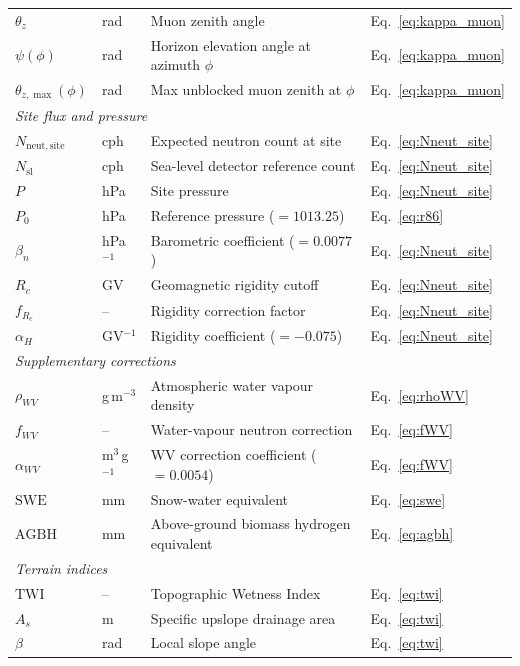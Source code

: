 \begin{table}[H]
\begin{tabularx}{\linewidth}{llXl}
$\theta_z$ & rad & Muon zenith angle & Eq.~\eqref{eq:kappa_muon} \\
$\psi(\phi)$ & rad & Horizon elevation angle at azimuth $\phi$ & Eq.~\eqref{eq:kappa_muon} \\
$\theta_{z,\max}(\phi)$ & rad & Max unblocked muon zenith at $\phi$ & Eq.~\eqref{eq:kappa_muon} \\
\midrule
\multicolumn{4}{l}{\textit{Site flux and pressure}} \\
$N_\mathrm{neut,site}$ & cph & Expected neutron count at site & Eq.~\eqref{eq:Nneut_site} \\
$N_\mathrm{sl}$ & cph & Sea-level detector reference count & Eq.~\eqref{eq:Nneut_site} \\
$P$        & hPa & Site pressure & Eq.~\eqref{eq:Nneut_site} \\
$P_0$      & hPa & Reference pressure ($= 1013.25$) & Eq.~\eqref{eq:r86} \\
$\beta_n$  & hPa$^{-1}$ & Barometric coefficient ($= 0.0077$) & Eq.~\eqref{eq:Nneut_site} \\
$R_c$      & GV & Geomagnetic rigidity cutoff & Eq.~\eqref{eq:Nneut_site} \\
$f_{R_c}$  & -- & Rigidity correction factor & Eq.~\eqref{eq:Nneut_site} \\
$\alpha_H$ & GV$^{-1}$ & Rigidity coefficient ($= -0.075$) & Eq.~\eqref{eq:Nneut_site} \\
\midrule
\multicolumn{4}{l}{\textit{Supplementary corrections}} \\
$\rho_{WV}$ & g\,m$^{-3}$ & Atmospheric water vapour density & Eq.~\eqref{eq:rhoWV} \\
$f_{WV}$   & -- & Water-vapour neutron correction & Eq.~\eqref{eq:fWV} \\
$\alpha_{WV}$ & m$^3$\,g$^{-1}$ & WV correction coefficient ($= 0.0054$) & Eq.~\eqref{eq:fWV} \\
$\mathrm{SWE}$ & mm & Snow-water equivalent & Eq.~\eqref{eq:swe} \\
$\mathrm{AGBH}$ & mm & Above-ground biomass hydrogen equivalent & Eq.~\eqref{eq:agbh} \\
\midrule
\multicolumn{4}{l}{\textit{Terrain indices}} \\
$\mathrm{TWI}$ & -- & Topographic Wetness Index & Eq.~\eqref{eq:twi} \\
$A_s$      & m & Specific upslope drainage area & Eq.~\eqref{eq:twi} \\
$\beta$    & rad & Local slope angle & Eq.~\eqref{eq:twi} \\
\bottomrule
\end{tabularx}
\end{table}
